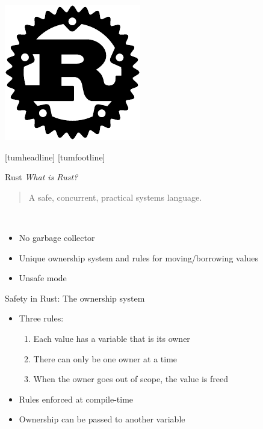 \documentclass[NET,english,aspectratio=169,notitleframe]{tumbeamer}
\begin{document}
\begin{frame}{}
\centering\includegraphics[height=0.87\textheight]{pics/rust}
\end{frame}
[tumheadline]
[tumfootline]

\begin{frame}{Rust}
\emph{What is Rust?}\\
\begin{quote}
A safe, concurrent, practical systems language.
\end{quote}\\
\begin{itemize}
\item No garbage collector
\item Unique ownership system and rules for moving/borrowing values
\item Unsafe mode
\end{itemize}
\end{frame}

\begin{frame}{Safety in Rust: The ownership system}
\begin{itemize}
\item Three rules:
\begin{enumerate}
\item Each value has a variable that is its owner
\item There can only be one owner at a time
\item When the owner goes out of scope, the value is freed
\end{enumerate}
\item Rules enforced at compile-time
\item Ownership can be passed to another variable%
\end{itemize}
\end{frame}
\end{document}
